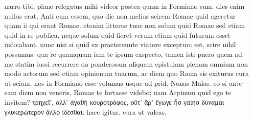 


 narro tibi, plane relegatus mihi videor postea quam in Formiano sum. dies enim nullus erat, Anti cum essem, quo die non melius scirem Romae quid ageretur quam ii qui erant Romae. etenim litterae tuae non solum quid Romae sed etiam quid in re publica, neque solum quid fieret verum etiam quid futurum esset indicabant. nunc nisi si quid ex praetereunte viatore exceptum est, scire nihil possumus. qua re quamquam iam te ipsum exspecto, tamen isti puero quem ad me statim iussi recurrere da ponderosam aliquam epistulam plenam omnium non modo actorum sed etiam opinionum tuarum, ac diem quo Roma sis exiturus cura ut sciam. nos in Formiano esse volumus usque ad prid. Nonas Maias. eo si ante eam diem non veneris, Romae te fortasse videbo; nam Arpinum quid ego te invitem? τρηχεῖ', ἀλλ' ἀγαθὴ κουροτρόφος, οὔτ' ἄρ' ἔγωγε ἧσ γαίησ δύναμαι γλυκερώτερον ἄλλο ἰδέσθαι. haec igitur. cura ut valeas.
